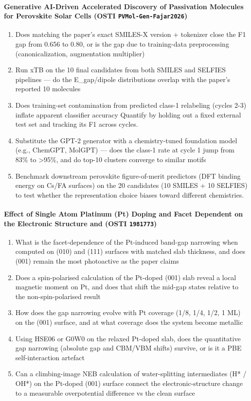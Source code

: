 \documentclass[11pt]{article}
\begin{document}
\paragraph{Generative AI-Driven Accelerated Discovery of Passivation Molecules for Perovskite Solar Cells \textnormal{\small(OSTI \texttt{PVMol-Gen-Fajar2026})}}
\begin{enumerate}[leftmargin=1.6em,itemsep=0.2em,topsep=0.2em,label=Q\arabic*.]
\item Does matching the paper's exact SMILES-X version + tokenizer close the F1 gap from 0.656 to 0.80, or is the gap due to training-data preprocessing (canonicalization, augmentation multiplier)
\item Run xTB on the 10 final candidates from both SMILES and SELFIES pipelines --- do the E\_gap/dipole distributions overlap with the paper's reported 10 molecules
\item Does training-set contamination from predicted class-1 relabeling (cycles 2-3) inflate apparent classifier accuracy Quantify by holding out a fixed external test set and tracking its F1 across cycles.
\item Substitute the GPT-2 generator with a chemistry-tuned foundation model (e.g., ChemGPT, MolGPT) --- does the class-1 rate at cycle 1 jump from 83\% to \textgreater{}95\%, and do top-10 clusters converge to similar motifs
\item Benchmark downstream perovskite figure-of-merit predictors (DFT binding energy on Cs/FA surfaces) on the 20 candidates (10 SMILES + 10 SELFIES) to test whether the representation choice biases toward different chemistries.
\end{enumerate}
\paragraph{Effect of Single Atom Platinum (Pt) Doping and Facet Dependent on the Electronic Structure and  \textnormal{\small(OSTI \texttt{1981773})}}
\begin{enumerate}[leftmargin=1.6em,itemsep=0.2em,topsep=0.2em,label=Q\arabic*.]
\item What is the facet-dependence of the Pt-induced band-gap narrowing when computed on (010) and (111) surfaces with matched slab thickness, and does (001) remain the most photoactive as the paper claims
\item Does a spin-polarised calculation of the Pt-doped (001) slab reveal a local magnetic moment on Pt, and does that shift the mid-gap states relative to the non-spin-polarised result
\item How does the gap narrowing evolve with Pt coverage (1/8, 1/4, 1/2, 1 ML) on the (001) surface, and at what coverage does the system become metallic
\item Using HSE06 or G0W0 on the relaxed Pt-doped slab, does the quantitative gap narrowing (absolute gap and CBM/VBM shifts) survive, or is it a PBE self-interaction artefact
\item Can a climbing-image NEB calculation of water-splitting intermediates (H* / OH*) on the Pt-doped (001) surface connect the electronic-structure change to a measurable overpotential difference vs the clean surface
\end{enumerate}
\end{document}
